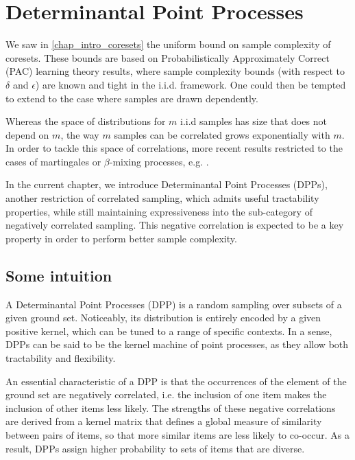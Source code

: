 \chapter{Determinantal Point Processes}
\label{chap_DPP}
We saw in \cref{chap_intro_coresets} the uniform bound on sample complexity of coresets. These bounds are based on Probabilistically Approximately Correct (PAC) learning theory results, where sample complexity bounds (with respect to $\delta$ and $\epsilon$) are known and tight in the i.i.d. framework. One could then be tempted to extend to the case where samples are drawn dependently.

Whereas the space of distributions for $m$ i.i.d samples has size that does not depend on $m$, the way $m$ samples can be correlated grows exponentially with $m$. In order to tackle this space of correlations, more recent results restricted to the cases of martingales or $\beta$-mixing processes, e.g. \cite{gao2016_learnability_beta_mixing}.

In the current chapter, we introduce Determinantal Point Processes (DPPs), another restriction of correlated sampling, which admits useful tractability properties, while still maintaining expressiveness into the sub-category of negatively correlated sampling. This negative correlation is expected to be a key property in order to perform better sample complexity.

\section{Some intuition}

A Determinantal Point Processes (DPP) is a random sampling over subsets of a given ground set. Noticeably, its distribution is entirely encoded by a given positive kernel, which can be tuned to a range of specific contexts. In a sense, DPPs can be said to be the kernel machine of point processes, as they allow both tractability and flexibility. 

An essential characteristic of a DPP is that the occurrences of the element of the ground set are negatively correlated, i.e. the inclusion of one item makes the inclusion of other items less likely. The strengths of these negative correlations are derived from a kernel matrix that defines a global measure of similarity between pairs of items, so that more similar items are less likely to co-occur. As a result, DPPs assign higher probability to sets of items that are diverse.




